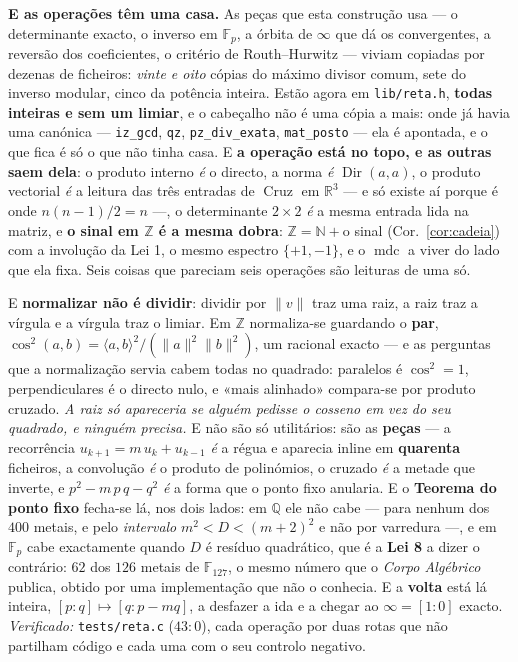 \documentclass[11pt,a4paper]{article}
\newcommand{\code}[1]{\texttt{\small #1}}
\begin{document}
\medskip
\noindent\textbf{E as operações têm uma casa.} As peças que esta construção usa --- o
determinante exacto, o inverso em $\mathbb{F}_p$, a órbita de $\infty$ que dá os
convergentes, a reversão dos coeficientes, o critério de Routh--Hurwitz --- viviam
copiadas por dezenas de ficheiros: \emph{vinte e oito} cópias do máximo divisor comum,
sete do inverso modular, cinco da potência inteira. Estão agora em \code{lib/reta.h},
\textbf{todas inteiras e sem um limiar}, e o cabeçalho não é uma cópia a mais: onde já
havia uma canónica --- \code{iz\_gcd}, \code{qz}, \code{pz\_div\_exata},
\code{mat\_posto} --- ela é apontada, e o que fica é só o que não tinha casa.
E \textbf{a operação está no topo, e as outras saem dela}: o produto interno \emph{é} o
directo, a norma \emph{é} $\operatorname{Dir}(a,a)$, o produto vectorial \emph{é} a
leitura das três entradas de $\operatorname{Cruz}$ em $\mathbb{R}^3$ --- e só existe aí
porque é onde $n(n-1)/2=n$ ---, o determinante $2\times2$ \emph{é} a mesma entrada lida
na matriz, e \textbf{o sinal em $\mathbb{Z}$ é a mesma dobra}: $\mathbb{Z}=\mathbb{N}+{}$o
sinal (Cor.~\ref{cor:cadeia}) com a involução da Lei 1, o mesmo espectro $\{+1,-1\}$, e o
$\operatorname{mdc}$ a viver do lado que ela fixa. Seis coisas que pareciam seis operações
são leituras de uma só.

\medskip
\noindent E \textbf{normalizar não é dividir}: dividir por $\lVert v\rVert$ traz uma raiz,
a raiz traz a vírgula e a vírgula traz o limiar. Em $\mathbb{Z}$ normaliza-se guardando o
\textbf{par}, $\cos^{2}(a,b)=\langle a,b\rangle^{2}/(\lVert a\rVert^{2}\lVert
b\rVert^{2})$, um racional exacto --- e as perguntas que a normalização servia cabem todas
no quadrado: paralelos é $\cos^{2}=1$, perpendiculares é o directo nulo, e «mais alinhado»
compara-se por produto cruzado. \emph{A raiz só apareceria se alguém pedisse o cosseno em
vez do seu quadrado, e ninguém precisa.}
E não são só utilitários: são as \textbf{peças} --- a recorrência $u_{k+1}=m\,u_k+u_{k-1}$
\emph{é} a régua e aparecia inline em \textbf{quarenta} ficheiros, a convolução \emph{é}
o produto de polinómios, o cruzado \emph{é} a metade que inverte, e
$p^{2}-m\,p\,q-q^{2}$ \emph{é} a forma que o ponto fixo anularia.
E o \textbf{Teorema do ponto fixo} fecha-se lá, nos dois lados: em $\mathbb{Q}$ ele não
cabe --- para nenhum dos $400$ metais, e pelo \emph{intervalo} $m^{2}<D<(m+2)^{2}$ e não
por varredura ---, e em $\mathbb{F}_p$ cabe exactamente quando $D$ é resíduo quadrático,
que é a \textbf{Lei 8} a dizer o contrário: $62$ dos $126$ metais de $\mathbb{F}_{127}$,
o mesmo número que o \emph{Corpo Algébrico} publica, obtido por uma implementação que não
o conhecia. E a \textbf{volta} está lá inteira, $[p:q]\mapsto[q:p-mq]$, a desfazer a ida
e a chegar ao $\infty=[1:0]$ exacto.
\emph{Verificado:} \code{tests/reta.c} ($43{:}0$), cada operação por duas rotas que não
partilham código e cada uma com o seu controlo negativo.
\end{document}
